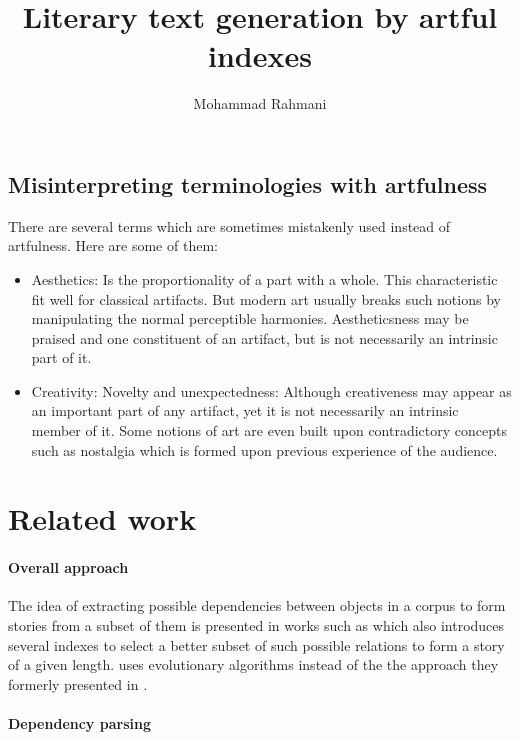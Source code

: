 \documentclass{article}
\begin{document}
	
	\title{Literary text generation by artful indexes}
	\author{Mohammad Rahmani}
	\date{}
	\maketitle
	\subsection{Misinterpreting terminologies with artfulness} 
	There are several terms which are sometimes mistakenly used instead of artfulness. Here are some of them:
	\begin{itemize}
		\item Aesthetics: Is the proportionality of a part with a whole. This characteristic fit well for classical artifacts. But modern art usually breaks such notions by manipulating the normal perceptible harmonies. Aestheticsness may be praised and one constituent of an artifact, but is not necessarily an intrinsic part of it.  
		\item Creativity: Novelty and unexpectedness: Although creativeness may appear as an important part of any artifact, yet it is not necessarily an intrinsic member of it. Some notions of art are even built upon contradictory concepts such as nostalgia which is formed upon previous experience of the audience.
	\end{itemize}

	\section {Related work} \label{sec:related-work}
		\paragraph{Overall approach }The idea of extracting possible dependencies between objects in a corpus to form stories from a subset of them is presented in works such as \citet{mcintyre-2009-learning-to-tell-tales-a-data-driven-approach-to-story-generation} which also introduces several indexes to select a better subset of such possible relations to form a story of a given length. \citet{mcintyre-2010-plot-induction-and-evolutionary-search-for-story-generation} uses evolutionary algorithms instead of the the approach they formerly presented in \citet{mcintyre-2009-learning-to-tell-tales-a-data-driven-approach-to-story-generation}. 
		\paragraph{Dependency parsing}
\end{document}
